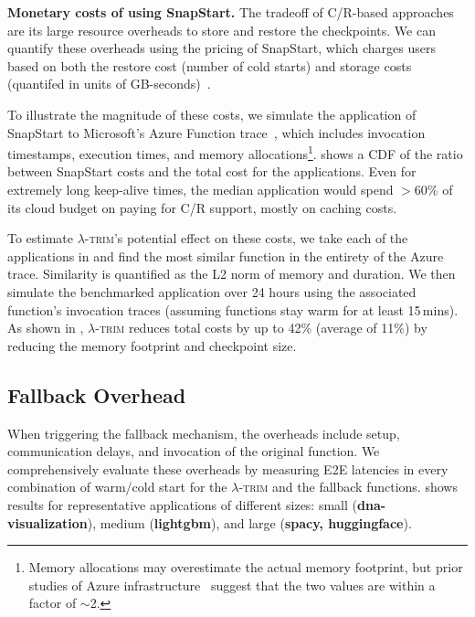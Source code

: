 \documentclass[sigplan,nonacm]{acmart}
\newcommand{\sys}{\textsc{\ensuremath{\lambda}-trim}\xspace}
\newcommand{\heading}[1]{\vspace{4pt}\noindent\textbf{#1.}}
\newcommand{\application}[1]{{\textcolor{pennblue}{\textbf{#1}}}}
\begin{document}
\heading{\boldmath Monetary costs of using SnapStart}
The tradeoff of C/R-based approaches are its large resource overheads to store and restore the checkpoints.
We can quantify these overheads using the pricing of SnapStart, which charges users based on both the restore cost (number of cold starts) and storage costs (quantifed in units of GB-seconds)~\cite{sspricing}.

To illustrate the magnitude of these costs, we simulate the application of SnapStart to Microsoft's Azure Function trace~\cite{wild2020}, which includes invocation timestamps, execution times, and memory allocations\footnote{Memory allocations may overestimate the actual memory footprint, but prior studies of Azure infrastructure~\cite{zhang2022compucache} suggest that the two values are within a factor of $\sim$2.}.
 shows a CDF of the ratio between SnapStart costs and the total cost for the applications.
Even for extremely long keep-alive times, the median application would spend $>$60\% of its cloud budget on paying for C/R support, mostly on caching costs.



To estimate \sys's potential effect on these costs, we take each of the applications in  and find the most similar function in the entirety of the Azure trace.
Similarity is quantified as the L2 norm of memory and duration.
We then simulate the benchmarked application over 24 hours using the associated function's invocation traces (assuming functions stay warm for at least 15\,mins).
As shown in , \sys reduces total costs by up to 42\% (average of 11\%) by reducing the memory footprint and checkpoint size.










 


\subsection{Fallback Overhead}\label{sec:fallback-overhead}

When triggering the fallback mechanism, the overheads include setup, communication delays, and invocation of the original function.
We comprehensively evaluate these overheads by measuring E2E latencies in every combination of warm/cold start for the \sys and the fallback functions.
 shows results for representative applications of different sizes: small (\application{dna-visualization}), medium (\application{lightgbm}), and large (\application{spacy, huggingface}).
\end{document}

